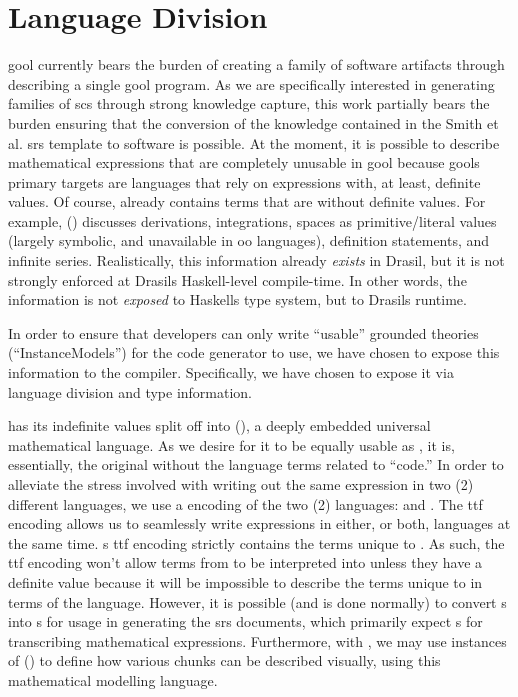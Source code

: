 \section{Language Division}

\acs{gool} currently bears the burden of creating a family of software artifacts
through describing a single \acs{gool} program. As we are specifically
interested in generating families of \acs{scs} through strong knowledge capture,
this work partially bears the burden ensuring that the conversion of the
knowledge contained in the Smith et al. \acs{srs} template
\cite{SmithAndLai2005} to software is possible. At the moment, it is possible to
describe mathematical expressions that are completely unusable in \acs{gool}
because \acsp{gool} primary targets are languages that rely on expressions with,
at least, definite values. Of course, \Expr{} already contains terms that are
without definite values. For example, \Expr{} ()
discusses derivations, integrations, spaces as primitive/literal values (largely
symbolic, and unavailable in \acs{oo} languages), definition statements, and
infinite series. Realistically, this information already \textit{exists} in
Drasil, but it is not strongly enforced at Drasils Haskell-level compile-time.
In other words, the information is not \textit{exposed} to Haskells type system,
but to Drasils runtime.

In order to ensure that developers can only write ``usable'' grounded theories
(``InstanceModels'') for the code generator to use, we have chosen to expose
this information to the compiler. Specifically, we have chosen to expose it via
language division and type information.

\languageDivision{}

\Expr{} has its indefinite values split off into \ModelExpr{}
(), a deeply embedded universal mathematical
language. As we desire for it to be equally usable as \Expr{}, it is,
essentially, the original \Expr{} without the language terms related to
``code.'' In order to alleviate the stress involved with writing out the same
expression in two (2) different languages, we use a  encoding of the
two (2) languages:  and
. The \acs{ttf} encoding allows us to seamlessly
write expressions in either, or both, languages at the same time. \ModelExpr{}s
\acs{ttf} encoding strictly contains the terms unique to \ModelExpr{}. As such,
the \acs{ttf} encoding won't allow terms from \ModelExpr{} to be interpreted
into \Expr{} unless they have a definite value because it will be impossible to
describe the terms unique to \ModelExpr{} in terms of the \Expr{} language.
However, it is possible (and is done normally) to convert \Expr{}s into
\ModelExpr{}s for usage in generating the \acs{srs} documents, which primarily
expect \ModelExpr{}s for transcribing mathematical expressions. Furthermore,
with \ModelExpr{}, we may use instances of \Express{}
() to define how various chunks can be described
visually, using this mathematical modelling language.


